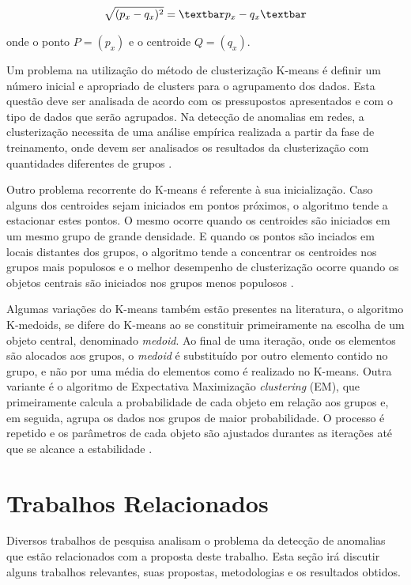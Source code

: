 \begin{equation}
\label{eq:Distância Euclidiana} %
\sqrt{(p_{x} - q_{x})^{2}} = \textbar p_{x} - q_{x} \textbar
\end{equation}

\noindent onde o ponto $P = (p_{x})$ e o centroide $Q = (q_{x})$.

\indent Um problema na utilização do método de clusterização K-means é definir um número inicial e apropriado de clusters para o agrupamento dos dados. Esta questão deve ser analisada de acordo com os pressupostos apresentados e com o tipo de dados que serão agrupados. Na detecção de anomalias em redes, a clusterização necessita de uma análise empírica realizada a partir da fase de treinamento, onde devem ser analisados os resultados da clusterização com quantidades diferentes de grupos \cite{munz2007}.

\indent Outro problema recorrente do K-means é referente à sua inicialização. Caso alguns dos centroides sejam iniciados em pontos próximos, o algoritmo tende a estacionar estes pontos. O mesmo ocorre quando os centroides são iniciados em um mesmo grupo de grande densidade. E quando os pontos são inciados em locais distantes dos grupos, o algoritmo tende a concentrar os centroides nos grupos mais populosos e o melhor desempenho de clusterização ocorre quando os objetos centrais são iniciados nos grupos menos populosos \cite{adaniya2012}.

\indent Algumas variações do K-means também estão presentes na literatura, o algoritmo K-medoids, se difere do K-means ao se constituir primeiramente na escolha de um objeto central, denominado \textit{medoid}. Ao final de uma iteração, onde os elementos são alocados aos grupos, o \textit{medoid} é substituído por outro elemento contido no grupo, e não por uma média do elementos como é realizado no K-means. Outra variante é o algoritmo de Expectativa Maximização \textit{clustering} (EM), que primeiramente calcula a probabilidade de cada objeto em relação aos grupos e, em seguida, agrupa os dados nos grupos de maior probabilidade. O processo é repetido e os parâmetros de cada objeto são ajustados durantes as iterações até que se alcance a estabilidade \cite{Syarif2012}.

  \section{Trabalhos Relacionados}

\indent Diversos trabalhos de pesquisa analisam o problema da detecção de anomalias que estão relacionados com a proposta deste trabalho. Esta seção irá discutir alguns trabalhos relevantes, suas propostas, metodologias e os resultados obtidos.

